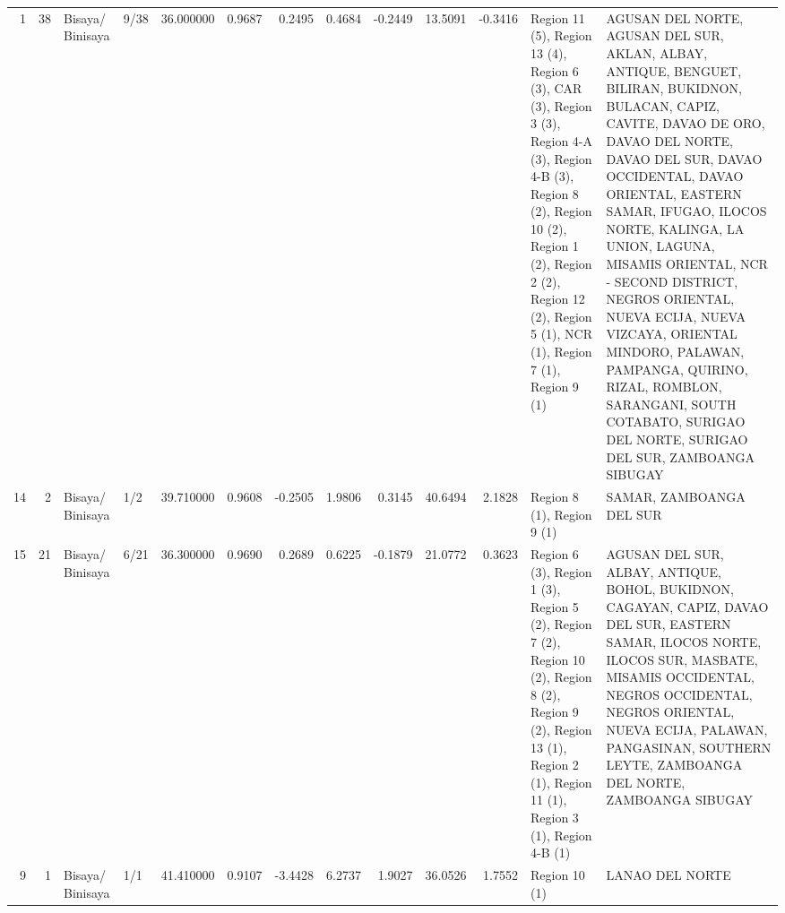 \begin{tabular}{rrllrrrrrrrll}
1 & 38 & Bisaya/ Binisaya & 9/38 & {\cellcolor[HTML]{7DA0F9}} \color[HTML]{F1F1F1} 36.000000 & 0.9687 & 0.2495 & 0.4684 & -0.2449 & 13.5091 & -0.3416 & Region 11 (5), Region 13 (4), Region 6 (3), CAR (3), Region 3 (3), Region 4-A (3), Region 4-B (3), Region 8 (2), Region 10 (2), Region 1 (2), Region 2 (2), Region 12 (2), Region 5 (1), NCR (1), Region 7 (1), Region 9 (1) & AGUSAN DEL NORTE, AGUSAN DEL SUR, AKLAN, ALBAY, ANTIQUE, BENGUET, BILIRAN, BUKIDNON, BULACAN, CAPIZ, CAVITE, DAVAO DE ORO, DAVAO DEL NORTE, DAVAO DEL SUR, DAVAO OCCIDENTAL, DAVAO ORIENTAL, EASTERN SAMAR, IFUGAO, ILOCOS NORTE, KALINGA, LA UNION, LAGUNA, MISAMIS ORIENTAL, NCR - SECOND DISTRICT, NEGROS ORIENTAL, NUEVA ECIJA, NUEVA VIZCAYA, ORIENTAL MINDORO, PALAWAN, PAMPANGA, QUIRINO, RIZAL, ROMBLON, SARANGANI, SOUTH COTABATO, SURIGAO DEL NORTE, SURIGAO DEL SUR, ZAMBOANGA SIBUGAY \\
14 & 2 & Bisaya/ Binisaya & 1/2 & {\cellcolor[HTML]{CBD8EE}} \color[HTML]{000000} 39.710000 & 0.9608 & -0.2505 & 1.9806 & 0.3145 & 40.6494 & 2.1828 & Region 8 (1), Region 9 (1) & SAMAR, ZAMBOANGA DEL SUR \\
15 & 21 & Bisaya/ Binisaya & 6/21 & {\cellcolor[HTML]{82A6FB}} \color[HTML]{F1F1F1} 36.300000 & 0.9690 & 0.2689 & 0.6225 & -0.1879 & 21.0772 & 0.3623 & Region 6 (3), Region 1 (3), Region 5 (2), Region 7 (2), Region 10 (2), Region 8 (2), Region 9 (2), Region 13 (1), Region 2 (1), Region 11 (1), Region 3 (1), Region 4-B (1) & AGUSAN DEL SUR, ALBAY, ANTIQUE, BOHOL, BUKIDNON, CAGAYAN, CAPIZ, DAVAO DEL SUR, EASTERN SAMAR, ILOCOS NORTE, ILOCOS SUR, MASBATE, MISAMIS OCCIDENTAL, NEGROS OCCIDENTAL, NEGROS ORIENTAL, NUEVA ECIJA, PALAWAN, PANGASINAN, SOUTHERN LEYTE, ZAMBOANGA DEL NORTE, ZAMBOANGA SIBUGAY \\
9 & 1 & Bisaya/ Binisaya & 1/1 & {\cellcolor[HTML]{E7D7CE}} \color[HTML]{000000} 41.410000 & 0.9107 & -3.4428 & 6.2737 & 1.9027 & 36.0526 & 1.7552 & Region 10 (1) & LANAO DEL NORTE \\
\bottomrule
\end{tabular}

